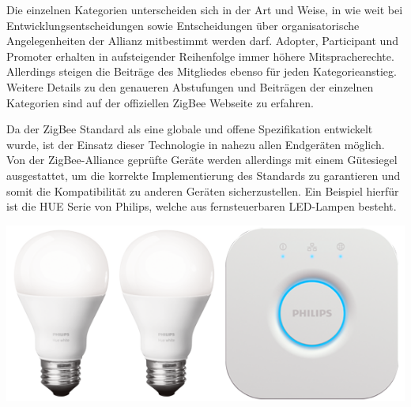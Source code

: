 \begin{multicols}{3}


Die einzelnen Kategorien unterscheiden sich in der Art und Weise, in wie weit bei Entwicklungsentscheidungen sowie Entscheidungen über organisatorische Angelegenheiten der Allianz mitbestimmt werden darf. Adopter, Participant und Promoter erhalten in aufsteigender Reihenfolge immer höhere Mitspracherechte. Allerdings steigen die Beiträge des Mitgliedes ebenso für jeden Kategorieanstieg.~\cite{zigbee.11} Weitere Details zu den genaueren Abstufungen und Beiträgen der einzelnen Kategorien sind auf der offiziellen ZigBee Webseite zu erfahren.
\par Da der ZigBee Standard als eine globale und offene Spezifikation entwickelt wurde, ist der Einsatz dieser Technologie in nahezu allen Endgeräten möglich. Von der ZigBee-Alliance  geprüfte Geräte werden allerdings mit einem Gütesiegel ausgestattet, um die korrekte Implementierung des Standards zu garantieren und somit die Kompatibilität zu anderen Geräten sicherzustellen. Ein Beispiel hierfür ist die HUE Serie von Philips, welche aus fernsteuerbaren LED-Lampen besteht.
\begin{Figure}
\includegraphics[width=\linewidth]{Kapitel/ZigBee/Grafiken/hue.png}
\label{fig:vorlage.zemath}
\end{Figure}


\end{multicols}
